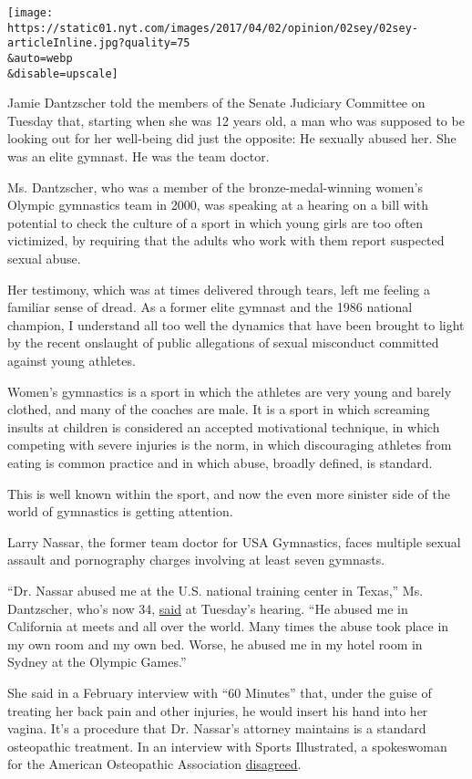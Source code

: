 \texttt{[image: https://static01.nyt.com/images/2017/04/02/opinion/02sey/02sey-articleInline.jpg?quality=75\\\&auto=webp\\\&disable=upscale]}

Jamie Dantzscher told the members of the Senate Judiciary Committee on
Tuesday that, starting when she was 12 years old, a man who was supposed
to be looking out for her well-being did just the opposite: He sexually
abused her. She was an elite gymnast. He was the team doctor.

Ms. Dantzscher, who was a member of the bronze-medal-winning women's
Olympic gymnastics team in 2000, was speaking at a hearing on a bill
with potential to check the culture of a sport in which young girls are
too often victimized, by requiring that the adults who work with them
report suspected sexual abuse.

Her testimony, which was at times delivered through tears, left me
feeling a familiar sense of dread. As a former elite gymnast and the
1986 national champion, I understand all too well the dynamics that have
been brought to light by the recent onslaught of public allegations of
sexual misconduct committed against young athletes.

Women's gymnastics is a sport in which the athletes are very young and
barely clothed, and many of the coaches are male. It is a sport in which
screaming insults at children is considered an accepted motivational
technique, in which competing with severe injuries is the norm, in which
discouraging athletes from eating is common practice and in which abuse,
broadly defined, is standard.

This is well known within the sport, and now the even more sinister side
of the world of gymnastics is getting attention.

Larry Nassar, the former team doctor for USA Gymnastics, faces multiple
sexual assault and pornography charges involving at least seven
gymnasts.

``Dr. Nassar abused me at the U.S. national training center in Texas,''
Ms. Dantzscher, who's now 34,
\href{http://www.ocregister.com/articles/gymnastics-747832-abuse-sexual.html}{said}
at Tuesday's hearing. ``He abused me in California at meets and all over
the world. Many times the abuse took place in my own room and my own
bed. Worse, he abused me in my hotel room in Sydney at the Olympic
Games.''

She said in a February interview with ``60 Minutes'' that, under the
guise of treating her back pain and other injuries, he would insert his
hand into her vagina. It's a procedure that Dr. Nassar's attorney
maintains is a standard osteopathic treatment. In an interview with
Sports Illustrated, a spokeswoman for the American Osteopathic
Association
\href{https://www.si.com/more-sports/2017/03/03/scorecard-protect-and-serve-lawrence-nassar-assault}{disagreed}.

